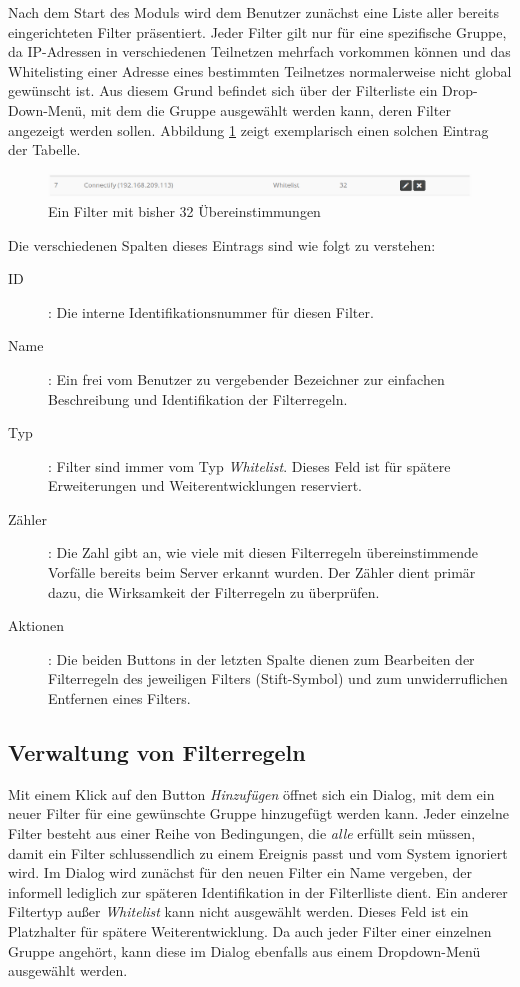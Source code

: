 \documentclass[12pt]{article}
\begin{document}
Nach dem Start des Moduls wird dem Benutzer zunächst eine Liste aller bereits eingerichteten Filter präsentiert. Jeder Filter gilt nur für eine spezifische Gruppe, da IP-Adressen in verschiedenen Teilnetzen mehrfach vorkommen können und das Whitelisting einer Adresse eines bestimmten Teilnetzes normalerweise nicht global gewünscht ist. Aus diesem Grund befindet sich über der Filterliste ein Drop-Down-Menü, mit dem die Gruppe ausgewählt werden kann, deren Filter angezeigt werden sollen. Abbildung \ref{fig:filter-list} zeigt exemplarisch einen solchen Eintrag der Tabelle.

\begin{figure}[h]
				\centering
				\includegraphics[width=\textwidth]{./graphics/filter-list.png}
				\caption{Ein Filter mit bisher 32 Übereinstimmungen}
				\label{fig:filter-list}
\end{figure}

Die verschiedenen Spalten dieses Eintrags sind wie folgt zu verstehen:

\begin{description}
				\item[ID]: Die interne Identifikationsnummer für diesen Filter.
				\item[Name]: Ein frei vom Benutzer zu vergebender Bezeichner zur einfachen Beschreibung und Identifikation der Filterregeln.
				\item[Typ]: Filter sind immer vom Typ \textit{Whitelist}. Dieses Feld ist für spätere Erweiterungen und Weiterentwicklungen reserviert.
				\item[Zähler]: Die Zahl gibt an, wie viele mit diesen Filterregeln übereinstimmende Vorfälle bereits beim Server erkannt wurden. Der Zähler dient primär dazu, die Wirksamkeit der Filterregeln zu überprüfen.
				\item[Aktionen]: Die beiden Buttons in der letzten Spalte dienen zum Bearbeiten der Filterregeln des jeweiligen Filters (Stift-Symbol) und zum unwiderruflichen Entfernen eines Filters.
\end{description}

\subsection{Verwaltung von Filterregeln}
Mit einem Klick auf den Button \textit{Hinzufügen} öffnet sich ein Dialog, mit dem ein neuer Filter für eine gewünschte Gruppe hinzugefügt werden kann. Jeder einzelne Filter besteht aus einer Reihe von Bedingungen, die \textit{alle} erfüllt sein müssen, damit ein Filter schlussendlich zu einem Ereignis passt und vom System ignoriert wird. Im Dialog wird zunächst für den neuen Filter ein Name vergeben, der informell lediglich zur späteren Identifikation in der Filterlliste dient. Ein anderer Filtertyp außer \textit{Whitelist} kann nicht ausgewählt werden. Dieses Feld ist ein Platzhalter für spätere Weiterentwicklung. Da auch jeder Filter einer einzelnen Gruppe angehört, kann diese im Dialog ebenfalls aus einem Dropdown-Menü ausgewählt werden.
\end{document}
